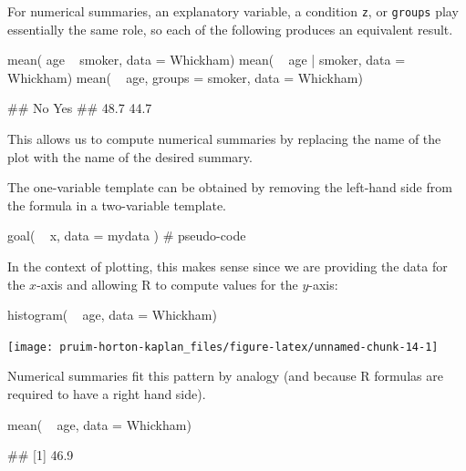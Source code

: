 For numerical summaries, an explanatory variable, a condition
\texttt{z}, or \texttt{groups} play essentially the same role, so each
of the following produces an equivalent result.

\begin{Schunk}
\begin{Sinput}
mean( age ~ smoker, data = Whickham)
mean( ~ age | smoker, data = Whickham)
mean( ~ age, groups = smoker, data = Whickham)
\end{Sinput}
\end{Schunk}\begin{Schunk}
\begin{Soutput}
##   No  Yes 
## 48.7 44.7
\end{Soutput}
\end{Schunk}

\noindent
This allows us to compute numerical summaries by replacing the name of
the plot with the name of the desired summary.

The one-variable template can be obtained by removing the left-hand side
from the formula in a two-variable template.

\begin{Schunk}
\begin{Sinput}
goal( ~ x, data = mydata )               # pseudo-code
\end{Sinput}
\end{Schunk}

\noindent
In the context of plotting, this makes sense since we are providing the
data for the \(x\)-axis and allowing R to compute values for the
\(y\)-axis:

\begin{Schunk}
\begin{Sinput}
histogram( ~ age, data = Whickham)
\end{Sinput}


\begin{center}\texttt{[image: pruim-horton-kaplan\_files/figure-latex/unnamed-chunk-14-1]} \end{center}

\end{Schunk}

\noindent
Numerical summaries fit this pattern by analogy (and because R formulas
are required to have a right hand side).

\begin{Schunk}
\begin{Sinput}
mean( ~ age, data = Whickham)
\end{Sinput}
\begin{Soutput}
## [1] 46.9
\end{Soutput}
\end{Schunk}

